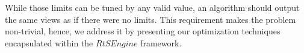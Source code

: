 While those limits can be tuned by any valid value, an algorithm should output the same views as if there were no limits. 
%
This requirement makes the problem non-trivial, hence, we address it by presenting our optimization techniques encapsulated within the $RtSEngine$ framework.
%
